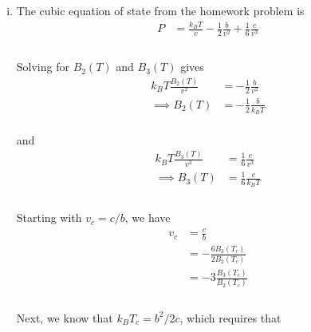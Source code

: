 \documentclass[]{article}
\begin{document}
\begin{enumerate}[1.]
\begin{enumerate}[i.]
\begin{itemize}
\end{itemize}

\item The cubic equation of state from the homework problem is \\

\begin{equation}
\begin{aligned}
P & = \frac{k_B T }{v} - \frac{1}{2} \frac{ b }{ v^2 } + \frac{1}{6} \frac{ c }{ v^3 } \\
\end{aligned}
\end{equation} \\

Solving for $B_2(T)$ and $B_3(T)$ gives \\

\begin{equation}
\begin{aligned}
k_B T \frac{ B_2(T) }{ v^2 } & = - \frac{1}{2} \frac{ b }{ v^2 } \\
\implies B_2(T) & =  - \frac{1}{2} \frac{ b }{ k_B T} 
\end{aligned}
\end{equation} \\

and \\

\begin{equation}
\begin{aligned}
k_B T \frac{ B_3(T) }{ v^3 } & =  \frac{1}{6} \frac{ c }{ v^3 }\\
\implies B_3(T) & =   \frac{1}{6} \frac{ c }{k_B T } \\
\end{aligned}
\end{equation} \\

Starting with $v_c = c/b$, we have \\

\begin{equation}
\begin{aligned}
v_c & = \frac{ c }{ b } \\ 
%
& =  - \frac{ 6 B_3(T_c) }{ 2 B_2(T_c) } \\
%
& =  - 3 \frac{  B_3(T_c) }{ B_2(T_c) } \\
\end{aligned}
\end{equation} \\

Next, we know that $k_B T_c = b^2 / 2c$, which requires that \\



\end{enumerate}
\end{enumerate}
\end{document}
